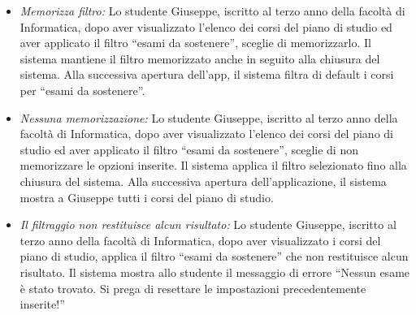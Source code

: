 \begin{itemize}
	\item \textit{Memorizza filtro:}
	Lo studente Giuseppe, iscritto al terzo anno della facoltà di Informatica, dopo aver visualizzato l’elenco dei corsi del piano di studio ed aver applicato il filtro “esami da sostenere”, sceglie di memorizzarlo. Il sistema mantiene il filtro memorizzato anche in seguito alla chiusura del sistema. Alla successiva apertura dell’app, il sistema filtra di default i corsi per “esami da sostenere”.
	
	\item \textit{Nessuna memorizzazione:}
	Lo studente Giuseppe, iscritto al terzo anno della facoltà di Informatica, dopo aver visualizzato l’elenco dei corsi del piano di studio ed aver applicato il filtro “esami da sostenere”, sceglie di non memorizzare le opzioni inserite. Il sistema applica il filtro selezionato fino alla chiusura del sistema. Alla successiva apertura dell'applicazione, il sistema mostra a Giuseppe tutti i corsi del piano di studio.
	
	\item \textit{Il filtraggio non restituisce alcun risultato:}
	Lo studente Giuseppe, iscritto al terzo anno della facoltà di Informatica, dopo aver visualizzato i corsi del piano di studio, applica il filtro “esami da sostenere” che non restituisce alcun risultato. Il sistema mostra allo studente il messaggio di errore “Nessun esame è stato trovato. Si prega di resettare le impostazioni precedentemente inserite!”
\end{itemize}

